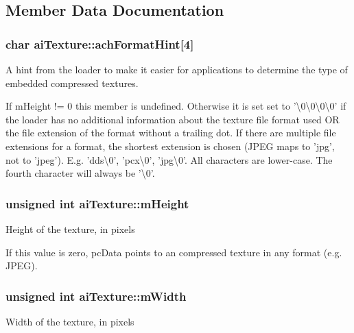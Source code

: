 \subsection{Member Data Documentation}
\hypertarget{structai_texture_aa9f44996acf3b301bfeb4e5348311540}{
\subsubsection[{ach\-Format\-Hint}]{\setlength{\rightskip}{0pt plus 5cm}char ai\-Texture\-::ach\-Format\-Hint\mbox{[}4\mbox{]}}}\label{structai_texture_aa9f44996acf3b301bfeb4e5348311540}
A hint from the loader to make it easier for applications to determine the type of embedded compressed textures.

If m\-Height != 0 this member is undefined. Otherwise it is set set to '\textbackslash{}0\textbackslash{}0\textbackslash{}0\textbackslash{}0' if the loader has no additional information about the texture file format used O\-R the file extension of the format without a trailing dot. If there are multiple file extensions for a format, the shortest extension is chosen (J\-P\-E\-G maps to 'jpg', not to 'jpeg'). E.\-g. 'dds\textbackslash{}0', 'pcx\textbackslash{}0', 'jpg\textbackslash{}0'. All characters are lower-\/case. The fourth character will always be '\textbackslash{}0'. \hypertarget{structai_texture_ac1e2fa6f1f646e9c55e3985d4418a752}{
\subsubsection[{m\-Height}]{\setlength{\rightskip}{0pt plus 5cm}unsigned {\bf int} ai\-Texture\-::m\-Height}}\label{structai_texture_ac1e2fa6f1f646e9c55e3985d4418a752}
Height of the texture, in pixels

If this value is zero, pc\-Data points to an compressed texture in any format (e.\-g. J\-P\-E\-G). \hypertarget{structai_texture_aaa3ad8cfe44fdc4dea2db91977d92234}{
\subsubsection[{m\-Width}]{\setlength{\rightskip}{0pt plus 5cm}unsigned {\bf int} ai\-Texture\-::m\-Width}}\label{structai_texture_aaa3ad8cfe44fdc4dea2db91977d92234}
Width of the texture, in pixels

